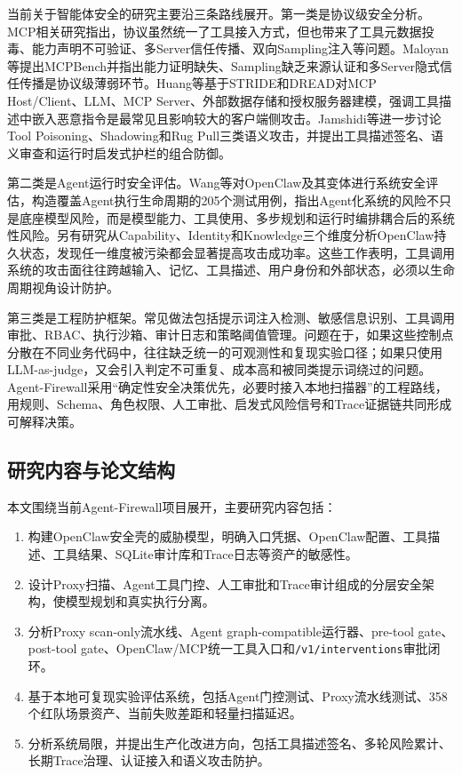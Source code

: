 \documentclass[UTF8,zihao=-4,scheme=chinese,fontset=none]{ctexart}
\newcommand{\code}[1]{{\ttfamily\small\nolinkurl{#1}}}
\begin{document}
当前关于智能体安全的研究主要沿三条路线展开。第一类是协议级安全分析。MCP相关研究指出，协议虽然统一了工具接入方式，但也带来了工具元数据投毒、能力声明不可验证、多Server信任传播、双向Sampling注入等问题。Maloyan等提出MCPBench并指出能力证明缺失、Sampling缺乏来源认证和多Server隐式信任传播是协议级薄弱环节\cite{maloyan2026breaking}。Huang等基于STRIDE和DREAD对MCP Host/Client、LLM、MCP Server、外部数据存储和授权服务器建模，强调工具描述中嵌入恶意指令是最常见且影响较大的客户端侧攻击\cite{huang2026mcp}。Jamshidi等进一步讨论Tool Poisoning、Shadowing和Rug Pull三类语义攻击，并提出工具描述签名、语义审查和运行时启发式护栏的组合防御\cite{jamshidi2025securing}。

第二类是Agent运行时安全评估。Wang等对OpenClaw及其变体进行系统安全评估，构造覆盖Agent执行生命周期的205个测试用例，指出Agent化系统的风险不只是底座模型风险，而是模型能力、工具使用、多步规划和运行时编排耦合后的系统性风险\cite{wang2026systematic}。另有研究从Capability、Identity和Knowledge三个维度分析OpenClaw持久状态，发现任一维度被污染都会显著提高攻击成功率\cite{wang2026asset}。这些工作表明，工具调用系统的攻击面往往跨越输入、记忆、工具描述、用户身份和外部状态，必须以生命周期视角设计防护。

第三类是工程防护框架。常见做法包括提示词注入检测、敏感信息识别、工具调用审批、RBAC、执行沙箱、审计日志和策略阈值管理。问题在于，如果这些控制点分散在不同业务代码中，往往缺乏统一的可观测性和复现实验口径；如果只使用LLM-as-judge，又会引入判定不可重复、成本高和被同类提示词绕过的问题。Agent-Firewall采用“确定性安全决策优先，必要时接入本地扫描器”的工程路线，用规则、Schema、角色权限、人工审批、启发式风险信号和Trace证据链共同形成可解释决策。

\subsection{研究内容与论文结构}

本文围绕当前Agent-Firewall项目展开，主要研究内容包括：

\begin{enumerate}[label=（\arabic*）]
  \item 构建OpenClaw安全壳的威胁模型，明确入口凭据、OpenClaw配置、工具描述、工具结果、SQLite审计库和Trace日志等资产的敏感性。
  \item 设计Proxy扫描、Agent工具门控、人工审批和Trace审计组成的分层安全架构，使模型规划和真实执行分离。
  \item 分析Proxy scan-only流水线、Agent graph-compatible运行器、pre-tool gate、post-tool gate、OpenClaw/MCP统一工具入口和\code{/v1/interventions}审批闭环。
  \item 基于本地可复现实验评估系统，包括Agent门控测试、Proxy流水线测试、358个红队场景资产、当前失败差距和轻量扫描延迟。
  \item 分析系统局限，并提出生产化改进方向，包括工具描述签名、多轮风险累计、长期Trace治理、认证接入和语义攻击防护。
\end{enumerate}
\end{document}
